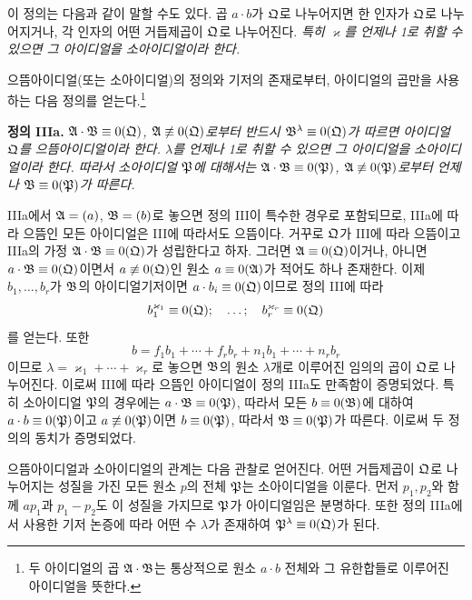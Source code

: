 이 정의는 다음과 같이 말할 수도 있다. 곱 $a\cdot b$가 $\mathfrak{Q}$로 나누어지면 한 인자가 $\mathfrak{Q}$로 나누어지거나, 각 인자의 어떤 거듭제곱이 $\mathfrak{Q}$로 나누어진다. \emph{특히 $\varkappa$를 언제나 1로 취할 수 있으면 그 아이디얼을 소아이디얼이라 한다.}

으뜸아이디얼(또는 소아이디얼)의 정의와 기저의 존재로부터, 아이디얼의 곱만을 사용하는 다음 정의를 얻는다.\footnote{두 아이디얼의 곱 $\mathfrak{A}\cdot\mathfrak{B}$는 통상적으로 원소 $a\cdot b$ 전체와 그 유한합들로 이루어진 아이디얼을 뜻한다.}

\textbf{정의 IIIa.} \emph{$\mathfrak{A}\cdot\mathfrak{B}\equiv0(\mathfrak{Q})$, $\mathfrak{A}\not\equiv0(\mathfrak{Q})$로부터 반드시 $\mathfrak{B}^\lambda\equiv0(\mathfrak{Q})$가 따르면 아이디얼 $\mathfrak{Q}$를 으뜸아이디얼이라 한다. $\lambda$를 언제나 1로 취할 수 있으면 그 아이디얼을 소아이디얼이라 한다. 따라서 소아이디얼 $\mathfrak{P}$에 대해서는 $\mathfrak{A}\cdot\mathfrak{B}\equiv0(\mathfrak{P})$, $\mathfrak{A}\not\equiv0(\mathfrak{P})$로부터 언제나 $\mathfrak{B}\equiv0(\mathfrak{P})$가 따른다.}

IIIa에서 $\mathfrak{A}=(a)$, $\mathfrak{B}=(b)$로 놓으면 정의 III이 특수한 경우로 포함되므로, IIIa에 따라 으뜸인 모든 아이디얼은 III에 따라서도 으뜸이다. 거꾸로 $\mathfrak{Q}$가 III에 따라 으뜸이고 IIIa의 가정 $\mathfrak{A}\cdot\mathfrak{B}\equiv0(\mathfrak{Q})$가 성립한다고 하자. 그러면 $\mathfrak{A}\equiv0(\mathfrak{Q})$이거나, 아니면 $a\cdot\mathfrak{B}\equiv0(\mathfrak{Q})$이면서 $a\not\equiv0(\mathfrak{Q})$인 원소 $a\equiv0(\mathfrak{A})$가 적어도 하나 존재한다. 이제 $b_1,\ldots,b_r$가 $\mathfrak{B}$의 아이디얼기저이면 $a\cdot b_i\equiv0(\mathfrak{Q})$이므로 정의 III에 따라
\[
 b_1^{\varkappa_1}\equiv0(\mathfrak{Q});\quad\ldots;\quad
 b_r^{\varkappa_r}\equiv0(\mathfrak{Q})
\]
를 얻는다. 또한
\[
 b=f_1b_1+\cdots+f_r b_r+n_1b_1+\cdots+n_r b_r
\]
이므로 $\lambda=\varkappa_1+\cdots+\varkappa_r$로 놓으면 $\mathfrak{B}$의 원소 $\lambda$개로 이루어진 임의의 곱이 $\mathfrak{Q}$로 나누어진다. 이로써 III에 따라 으뜸인 아이디얼이 정의 IIIa도 만족함이 증명되었다. 특히 소아이디얼 $\mathfrak{P}$의 경우에는 $a\cdot\mathfrak{B}\equiv0(\mathfrak{P})$, 따라서 모든 $b\equiv0(\mathfrak{B})$에 대하여 $a\cdot b\equiv0(\mathfrak{P})$이고 $a\not\equiv0(\mathfrak{P})$이면 $b\equiv0(\mathfrak{P})$, 따라서 $\mathfrak{B}\equiv0(\mathfrak{P})$가 따른다. 이로써 두 정의의 동치가 증명되었다.

으뜸아이디얼과 소아이디얼의 관계는 다음 관찰로 얻어진다. 어떤 거듭제곱이 $\mathfrak{Q}$로 나누어지는 성질을 가진 모든 원소 $p$의 전체 $\mathfrak{P}$는 소아이디얼을 이룬다. 먼저 $p_1,p_2$와 함께 $a p_1$과 $p_1-p_2$도 이 성질을 가지므로 $\mathfrak{P}$가 아이디얼임은 분명하다. 또한 정의 IIIa에서 사용한 기저 논증에 따라 어떤 수 $\lambda$가 존재하여 $\mathfrak{P}^\lambda\equiv0(\mathfrak{Q})$가 된다.

